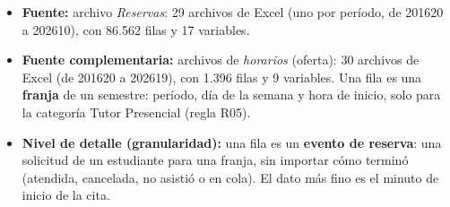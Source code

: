 \documentclass[11pt,letterpaper]{article}
\begin{document}
\begin{itemize}[leftmargin=1.5em,itemsep=2pt]
\item \textbf{Fuente:} archivo \emph{Reservas}: 29 archivos de Excel (uno por período, de 201620 a 202610), con 86.562 filas y 17 variables.
\item \textbf{Fuente complementaria:} archivos de \emph{horarios} (oferta): 30 archivos de Excel (de 201620 a 202619), con 1.396 filas y 9 variables. Una fila es una \textbf{franja} de un semestre: período, día de la semana y hora de inicio, solo para la categoría Tutor Presencial (regla R05).
\item \textbf{Nivel de detalle (granularidad):} una fila es un \textbf{evento de reserva}: una solicitud de un estudiante para una franja, sin importar cómo terminó (atendida, cancelada, no asistió o en cola). El dato más fino es el minuto de inicio de la cita.
\end{itemize}
\end{document}
